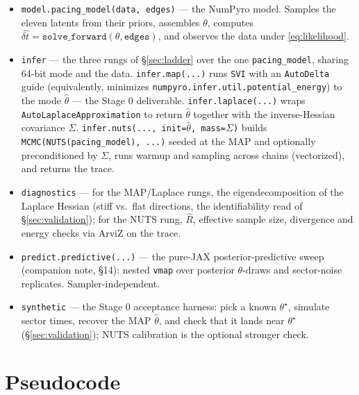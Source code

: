 \documentclass[11pt]{article}
\newcommand{\dt}{\widehat{\delta t}}
\begin{document}
{\begin{itemize}
\item \texttt{model.pacing\_model(data, edges)} --- the NumPyro model. Samples the eleven latents from their priors, assembles $\theta$, computes $\dt = \texttt{solve\_forward}(\theta, \texttt{edges})$, and observes the data under \eqref{eq:likelihood}.

\item \texttt{infer} --- the three rungs of \S\ref{sec:ladder} over the one \texttt{pacing\_model}, sharing 64-bit mode and the data. \texttt{infer.map(...)} runs \texttt{SVI} with an \texttt{AutoDelta} guide (equivalently, minimizes \texttt{numpyro.infer.util.potential\_energy}) to the mode $\hat\theta$ --- the Stage 0 deliverable. \texttt{infer.laplace(...)} wraps \texttt{AutoLaplaceApproximation} to return $\hat\theta$ together with the inverse-Hessian covariance $\Sigma$. \texttt{infer.nuts(..., init=$\hat\theta$, mass=$\Sigma$)} builds \texttt{MCMC(NUTS(pacing\_model), ...)} seeded at the MAP and optionally preconditioned by $\Sigma$, runs warmup and sampling across chains (vectorized), and returns the trace.

\item \texttt{diagnostics} --- for the MAP/Laplace rungs, the eigendecomposition of the Laplace Hessian (stiff vs.\ flat directions, the identifiability read of \S\ref{sec:validation}); for the NUTS rung, $\hat R$, effective sample size, divergence and energy checks via ArviZ on the trace.

\item \texttt{predict.predictive(...)} --- the pure-JAX posterior-predictive sweep (companion note, \S14): nested \texttt{vmap} over posterior $\theta$-draws and sector-noise replicates. Sampler-independent.

\item \texttt{synthetic} --- the Stage 0 acceptance harness: pick a known $\theta^\star$, simulate sector times, recover the MAP $\hat\theta$, and check that it lands near $\theta^\star$ (\S\ref{sec:validation}); NUTS calibration is the optional stronger check.
\end{itemize}
\par}

\section{Pseudocode}
\end{document}
